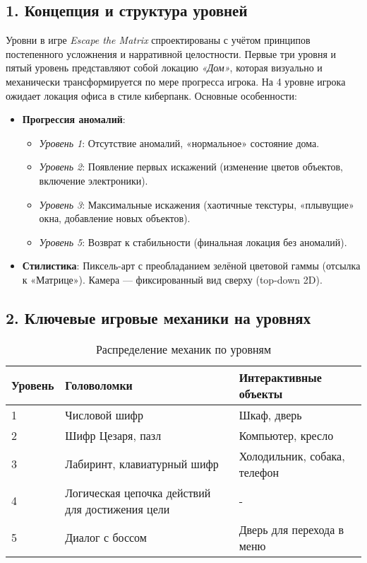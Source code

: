 \documentclass{article}
\begin{document}
\subsection*{1. Концепция и структура уровней}
Уровни в игре \textit{Escape the Matrix} спроектированы с учётом принципов постепенного усложнения и нарративной целостности. Первые три уровня и пятый уровень представляют собой локацию \textit{«Дом»}, которая визуально и механически трансформируется по мере прогресса игрока. На 4 уровне игрока ожидает локация офиса в стиле киберпанк. Основные особенности:
\begin{itemize}
    \item \textbf{Прогрессия аномалий}: 
    \begin{itemize}
        \item \textit{Уровень 1}: Отсутствие аномалий, «нормальное» состояние дома.
        \item \textit{Уровень 2}: Появление первых искажений (изменение цветов объектов, включение электроники).
        \item \textit{Уровень 3}: Максимальные искажения (хаотичные текстуры, «плывущие» окна, добавление новых объектов).
        \item \textit{Уровень 5}: Возврат к стабильности (финальная локация без аномалий).
    \end{itemize}
    \item \textbf{Стилистика}: Пиксель-арт с преобладанием зелёной цветовой гаммы (отсылка к «Матрице»). Камера — фиксированный вид сверху (top-down 2D).
\end{itemize}

\subsection*{2. Ключевые игровые механики на уровнях}
\begin{table}[h]
    \centering
    \begin{tabular}{|l|l|l|}
        \hline
        \textbf{Уровень} & \textbf{Головоломки} & \textbf{Интерактивные объекты} \\ \hline
        1 & Числовой шифр & Шкаф, дверь \\ \hline
        2 & Шифр Цезаря, пазл & Компьютер, кресло \\ \hline
        3 & Лабиринт, клавиатурный шифр & Холодильник, собака, телефон \\ \hline
        4 & Логическая цепочка действий для достижения цели &  -\\ \hline
        5 & Диалог с боссом & Дверь для перехода в меню \\ \hline
    \end{tabular}
    \caption{Распределение механик по уровням}
\end{table}
\end{document}
